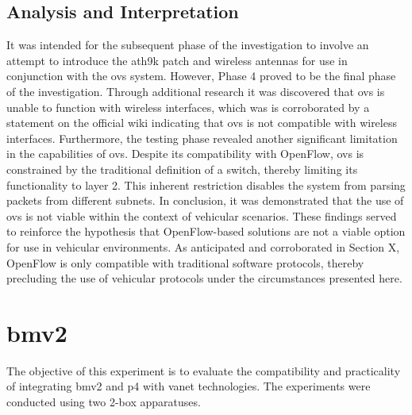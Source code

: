\subsection{Analysis and Interpretation}
It was intended for the subsequent phase of the investigation to involve an attempt to introduce the ath9k patch and wireless antennas for use in conjunction with the \gls{ovs} system. However, Phase 4 proved to be the final phase of the investigation. Through additional research it was discovered that \gls{ovs} is unable to function with wireless interfaces, which was is corroborated by a statement on the official wiki\cite{noauthor_common_nodate} indicating that \gls{ovs} is not compatible with wireless interfaces.
Furthermore, the testing phase revealed another significant limitation in the capabilities of \gls{ovs}. Despite its compatibility with OpenFlow, \gls{ovs} is constrained by the traditional definition of a switch, thereby limiting its functionality to layer 2. This inherent restriction disables the system from parsing packets from different subnets.
In conclusion, it was demonstrated that the use of \gls{ovs} is not viable within the context of vehicular scenarios. These findings served to reinforce the hypothesis that OpenFlow-based solutions are not a viable option for use in vehicular environments. As anticipated and corroborated in Section X, OpenFlow is only compatible with traditional software protocols, thereby precluding the use of vehicular protocols under the circumstances presented here. 


\section[BMv2]{\gls{bmv2}}
The objective of this experiment is to evaluate the compatibility and practicality of integrating \gls{bmv2} and \gls{p4} with \gls{vanet} technologies. The experiments were conducted using two 2-box apparatuses.

